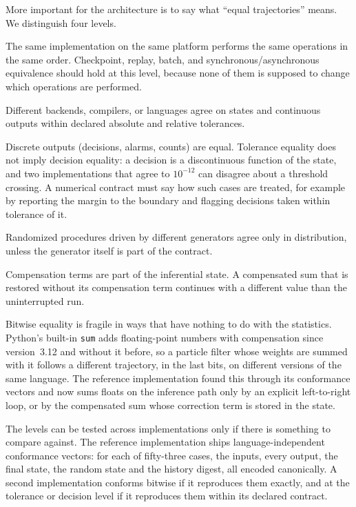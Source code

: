 \documentclass[11pt,a4paper]{article}
\theoremstyle{definition}
\theoremstyle{remark}
\newcommand{\code}[1]{\texttt{#1}}
\begin{document}
More important for the architecture is to say what ``equal
trajectories'' means. We distinguish four levels.

\begin{description}[leftmargin=2em,style=nextline,itemsep=2pt]
    \item[Bitwise equality.]
    The same implementation on the same platform performs the same
    operations in the same order. Checkpoint, replay, batch, and
    synchronous/asynchronous equivalence should hold at this level,
    because none of them is supposed to change which operations are
    performed.
    \item[Tolerance equality.]
    Different backends, compilers, or languages agree on states and
    continuous outputs within declared absolute and relative tolerances.
    \item[Decision equality.]
    Discrete outputs (decisions, alarms, counts) are equal. Tolerance
    equality does not imply decision equality: a decision is a
    discontinuous function of the state, and two implementations that
    agree to $10^{-12}$ can disagree about a threshold crossing. A
    numerical contract must say how such cases are treated, for example
    by reporting the margin to the boundary and flagging decisions taken
    within tolerance of it.
    \item[Distributional equality.]
    Randomized procedures driven by different generators agree only in
    distribution, unless the generator itself is part of the contract.
\end{description}

Compensation terms are part of the inferential state. A compensated sum
that is restored without its compensation term continues with a
different value than the uninterrupted run.

Bitwise equality is fragile in ways that have nothing to do with the
statistics. Python's built-in \code{sum} adds floating-point numbers with
compensation since version~3.12 and without it before, so a particle
filter whose weights are summed with it follows a different trajectory,
in the last bits, on different versions of the same language. The
reference implementation found this through its conformance vectors and
now sums floats on the inference path only by an explicit left-to-right
loop, or by the compensated sum whose correction term is stored in the
state.

The levels can be tested across implementations only if there is
something to compare against. The reference implementation ships
language-independent conformance vectors: for each of fifty-three cases,
the inputs, every output, the final state, the random state and the
history digest, all encoded canonically. A second implementation
conforms bitwise if it reproduces them exactly, and at the tolerance or
decision level if it reproduces them within its declared contract.
\end{document}
